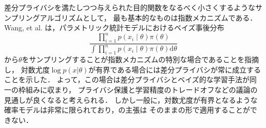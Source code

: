 \documentclass{jarticle}
\newcommand{\dd}{\mathrm{d}}
\theoremstyle{definition}
\begin{document}
差分プライバシを満たしつつ与えられた目的関数をなるべく小さくするようなサンプリングアルゴリズムとして，
最も基本的なものは指数メカニズム\cite{McSherry2007}である．
Wang, et al. \cite{Wang2015b}は，パラメトリック統計モデルにおけるベイズ事後分布
\begin{equation}
\frac{\prod_{i=1}^{n} p(x_i \mid \theta) \pi(\theta)}
{\int \prod_{i=1}^{n} p(x_i \mid \theta) \pi(\theta) \dd\theta}
\end{equation}
から$\theta$をサンプリングすることが指数メカニズムの特別な場合であることを指摘し，
対数尤度$\log p(x|\theta)$が有界である場合には差分プライバシが常に成立することを示した．
よって，この場合は差分プライバシとベイズ的な学習手法が同一の枠組みに収まり，
プライバシ保護と学習精度のトレードオフなどの議論の見通しが良くなると考えられる．
しかし一般に，対数尤度が有界となるような確率モデルは非常に限られており，\cite{Wang2015b}の主張は
そのままの形で適用することができない．
\end{document}
